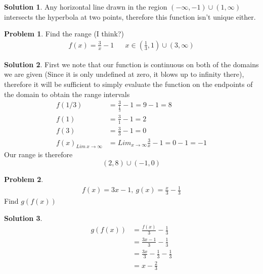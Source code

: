 \documentclass[a4paper]{article}
\theoremstyle{definition}
\newtheorem{problem}{Problem}[section]
\newtheorem*{solution}{Solution}
\begin{document}
\begin{solution}
Any horizontal line drawn in the region \((-\infty, -1) \cup (1, \infty)\) intersects the hyperbola at two points, therefore this function isn't unique either.
\end{solution}


\begin{problem}
Find the range (I think?)
\begin{align*}
f(x) = \frac{3}{x} -1 && x \in (\frac{1}{3}, 1) \cup (3, \infty)
\end{align*}
\end{problem}
\begin{solution}
First we note that our function is continuous on both of the domains we are given (Since it is only undefined at zero, it blows up to infinity there), therefore it will be sufficient to simply evaluate the function on the endpoints of the domain to obtain the range intervals
\begin{align*}
f(1/3) &=\frac{3}{\frac{1}{3}} - 1 = 9-1 = 8 \\
f(1) &= \frac{3}{1} -1 = 2 \\
f(3) &= \frac{3}{3} -1 = 0 \\
f(x)_{Lim\ x \to \infty} &= Lim_{x\to \infty} \frac{3}{x} - 1 = 0 - 1 = -1
\end{align*}
Our range is therefore
\[
(2, 8) \cup (-1, 0)
\]
\end{solution}

\begin{problem}
\begin{align*}
f(x) = 3x-1, \ g(x) =\frac{x}{3} - \frac{1}{3}
\end{align*}
Find \(g(f(x))\)
\end{problem}
\begin{solution}
\begin{align*}
g(f(x)) &= \frac{f(x)}{3} - \frac{1}{3} \\
    &= \frac{3x - 1}{3} - \frac{1}{3} \\
    &= \frac{3x}{3} - \frac{1}{3} -\frac{1}{3} \\
    &= x -\frac{2}{3}
\end{align*}
\end{solution}
\end{document}
